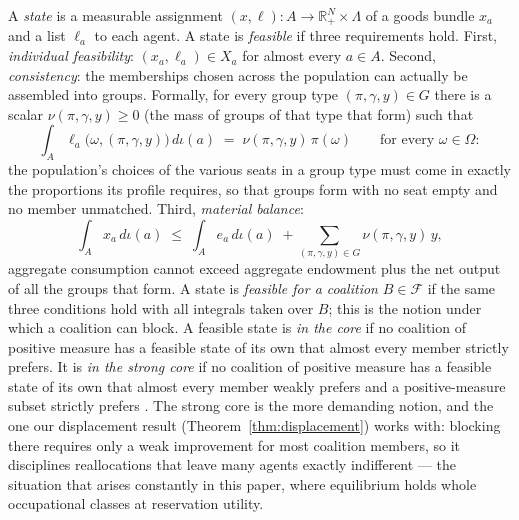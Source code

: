 \documentclass[12pt,letterpaper]{article}
\theoremstyle{definition}
\newcommand{\R}{\mathbb{R}}
\begin{document}
A \emph{state} is a measurable assignment $(x,\ell):A\rightarrow\R^N_+\times\Lambda$ of a goods bundle $x_a$ and a list $\ell_a$ to each agent.
A state is \emph{feasible} if three requirements hold.
First, \emph{individual feasibility}: $(x_a,\ell_a)\in X_a$ for almost every $a\in A$.
Second, \emph{consistency}: the memberships chosen across the population can actually be assembled into groups.
Formally, for every group type $(\pi,\gamma,y)\in G$ there is a scalar $\nu(\pi,\gamma,y)\geq 0$ (the mass of groups of that type that form) such that
\[
\int_A \ell_a\big(\omega,(\pi,\gamma,y)\big)\,d\iota(a) \;=\; \nu(\pi,\gamma,y)\,\pi(\omega)
\qquad\text{for every } \omega\in\Omega :
\]
the population's choices of the various seats in a group type must come in exactly the proportions its profile requires, so that groups form with no seat empty and no member unmatched.
Third, \emph{material balance}:
\[
\int_A x_a\,d\iota(a) \;\leq\; \int_A e_a\,d\iota(a) \;+ \sum_{(\pi,\gamma,y)\in G}\nu(\pi,\gamma,y)\,y ,
\]
aggregate consumption cannot exceed aggregate endowment plus the net output of all the groups that form.
A state is \emph{feasible for a coalition} $B\in\mathcal{F}$ if the same three conditions hold with all integrals taken over $B$; this is the notion under which a coalition can block.
A feasible state is \emph{in the core} if no coalition of positive measure has a feasible state of its own that almost every member strictly prefers.
It is \emph{in the strong core} if no coalition of positive measure has a feasible state of its own that almost every member weakly prefers and a positive-measure subset strictly prefers \citep[pp.~161--162]{ellickson2006organization}.
The strong core is the more demanding notion, and the one our displacement result (Theorem~\ref{thm:displacement}) works with: blocking there requires only a weak improvement for most coalition members, so it disciplines reallocations that leave many agents exactly indifferent --- the situation that arises constantly in this paper, where equilibrium holds whole occupational classes at reservation utility.
\end{document}
